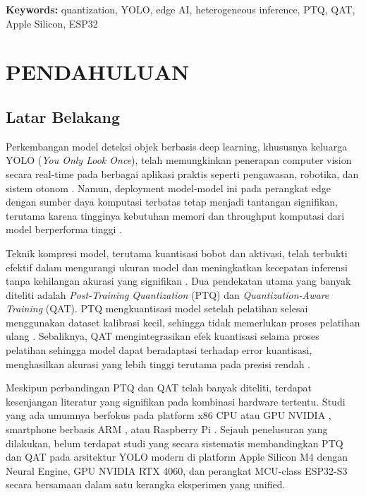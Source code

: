 \documentclass[12pt, a4paper]{report}
\begin{document}
\vspace{0.5cm}
\noindent\textbf{Keywords:} quantization, YOLO, edge AI, heterogeneous inference, PTQ, QAT, Apple Silicon, ESP32
\newpage

\tableofcontents
\newpage
\listoffigures
\newpage
\listoftables
\newpage

\setcounter{page}{1}

\chapter{PENDAHULUAN}

\section{Latar Belakang}

Perkembangan model deteksi objek berbasis deep learning, khususnya
keluarga YOLO (\textit{You Only Look Once}), telah memungkinkan
penerapan computer vision secara real-time pada berbagai aplikasi
praktis seperti pengawasan, robotika, dan sistem otonom \cite{redmon2016yolo}.
Namun, deployment model-model ini pada perangkat edge dengan sumber
daya komputasi terbatas tetap menjadi tantangan signifikan, terutama
karena tingginya kebutuhan memori dan throughput komputasi dari
model berperforma tinggi \cite{jacob2018quantization}.

Teknik kompresi model, terutama kuantisasi bobot dan aktivasi,
telah terbukti efektif dalam mengurangi ukuran model dan meningkatkan
kecepatan inferensi tanpa kehilangan akurasi yang signifikan \cite{han2015deep}.
Dua pendekatan utama yang banyak diteliti adalah
\textit{Post-Training Quantization} (PTQ) dan
\textit{Quantization-Aware Training} (QAT).
PTQ mengkuantisasi model setelah pelatihan selesai menggunakan
dataset kalibrasi kecil, sehingga tidak memerlukan proses pelatihan
ulang \cite{banner2019post}.
Sebaliknya, QAT mengintegrasikan efek kuantisasi selama proses
pelatihan sehingga model dapat beradaptasi terhadap error kuantisasi,
menghasilkan akurasi yang lebih tinggi terutama pada presisi rendah \cite{jacob2018quantization}.

Meskipun perbandingan PTQ dan QAT telah banyak diteliti, terdapat
kesenjangan literatur yang signifikan pada kombinasi hardware tertentu.
Studi yang ada umumnya berfokus pada platform x86 CPU atau GPU NVIDIA \cite{wangqyolo2023},
smartphone berbasis ARM \cite{idama2024qatfp}, atau Raspberry Pi \cite{boddu2025yolov4}.
Sejauh penelusuran yang dilakukan, belum terdapat studi yang
secara sistematis membandingkan PTQ dan QAT pada arsitektur YOLO
modern di platform Apple Silicon M4 dengan Neural Engine,
GPU NVIDIA RTX 4060, dan perangkat MCU-class ESP32-S3 secara
bersamaan dalam satu kerangka eksperimen yang unified.
\end{document}
